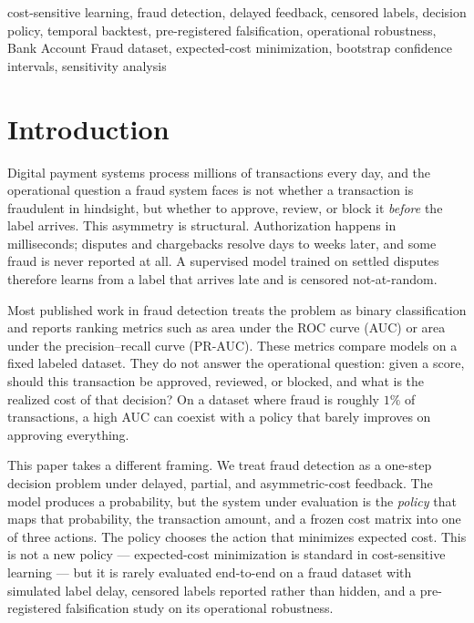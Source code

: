 \documentclass[conference]{IEEEtran}
\begin{document}
\begin{IEEEkeywords}
cost-sensitive learning, fraud detection, delayed feedback, censored labels,
decision policy, temporal backtest, pre-registered falsification,
operational robustness, Bank Account Fraud dataset, expected-cost
minimization, bootstrap confidence intervals, sensitivity analysis
\end{IEEEkeywords}

\section{Introduction}

Digital payment systems process millions of transactions every day, and the
operational question a fraud system faces is not whether a transaction is
fraudulent in hindsight, but whether to approve, review, or block it
\emph{before} the label arrives. This asymmetry is structural. Authorization
happens in milliseconds; disputes and chargebacks resolve days to weeks
later, and some fraud is never reported at all. A supervised model trained
on settled disputes therefore learns from a label that arrives late and is
censored not-at-random.

Most published work in fraud detection treats the problem as binary
classification and reports ranking metrics such as area under the ROC curve
(AUC) or area under the precision--recall curve (PR-AUC). These metrics
compare models on a fixed labeled dataset. They do not answer the
operational question: given a score, should this transaction be approved,
reviewed, or blocked, and what is the realized cost of that decision? On a
dataset where fraud is roughly $1\%$ of transactions, a high AUC can coexist
with a policy that barely improves on approving everything.

This paper takes a different framing. We treat fraud detection as a
one-step decision problem under delayed, partial, and asymmetric-cost
feedback. The model produces a probability, but the system under evaluation
is the \emph{policy} that maps that probability, the transaction amount, and
a frozen cost matrix into one of three actions. The policy chooses the
action that minimizes expected cost. This is not a new policy ---
expected-cost minimization is standard in cost-sensitive learning --- but it
is rarely evaluated end-to-end on a fraud dataset with simulated label
delay, censored labels reported rather than hidden, and a pre-registered
falsification study on its operational robustness.
\end{document}
